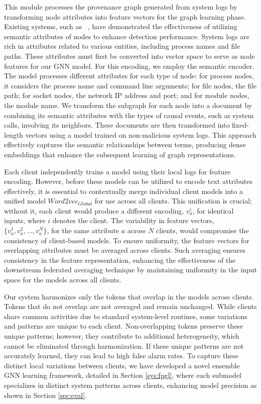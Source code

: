 This module processes the provenance graph generated from system logs by transforming node attributes into feature vectors for the graph learning phase. Existing systems, such as \flash~\cite{flash2024}, have demonstrated the effectiveness of utilizing semantic attributes of nodes to enhance detection performance. System logs are rich in attributes related to various entities, including process names and file paths. These attributes must first be converted into vector space to serve as node features for our GNN model. For this encoding, we employ the \wordvec semantic encoder. The \wordvec model processes different attributes for each type of node: for process nodes, it considers the process name and command line arguments; for file nodes, the file path; for socket nodes, the network IP address and port; and for module nodes, the module name. We transform the subgraph for each node into a document by combining its semantic attributes with the types of causal events, such as system calls, involving its neighbors. These documents are then transformed into fixed-length vectors using a \wordvec model trained on non-malicious system logs. This approach effectively captures the semantic relationships between terms, producing dense embeddings that enhance the subsequent learning of graph representations.

 Each client independently trains a \wordvec model using their local logs for feature encoding. However, before these models can be utilized to encode text attributes effectively, it is essential to contextually merge individual client \wordvec models into a unified model \( Word2vec_{Global} \) for use across all clients. This unification is crucial; without it, each client would produce a different encoding, \(v_a^i\), for identical inputs, where \(i\) denotes the client. The variability in feature vectors, \(\{v_a^1, v_a^2, \ldots, v_a^N\}\), for the same attribute \(a\) across \(N\) clients, would compromise the consistency of client-based \gnnshort models. To ensure uniformity, the feature vectors for overlapping attributes must be averaged across clients. Such averaging ensures consistency in the feature representation, enhancing the effectiveness of the downstream federated averaging technique by maintaining uniformity in the input space for the \gnnshort models across all clients.

 Our system harmonizes only the tokens that overlap in the \wordvec models across clients. Tokens that do not overlap are not averaged and remain unchanged. While clients share common activities due to standard system-level routines, some variations and patterns are unique to each client. Non-overlapping tokens preserve these unique patterns; however, they contribute to additional heterogeneity, which cannot be eliminated through harmonization. If these unique patterns are not accurately learned, they can lead to high false alarm rates. To capture these distinct local variations between clients, we have developed a novel ensemble GNN learning framework, detailed in Section \ref{sys:fpgl}, where each submodel specializes in distinct system patterns across clients, enhancing model precision as shown in Section \ref{sec:eval}.


